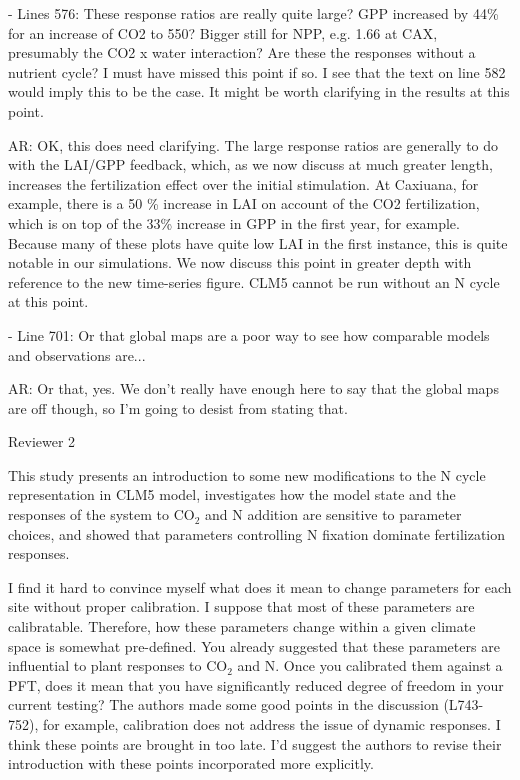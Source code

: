 \documentclass{article}
\begin{document}
- Lines 576: These response ratios are really quite large? GPP increased by 44\% for an increase of CO2 to 550? Bigger still for NPP, e.g. 1.66 at CAX, presumably the CO2 x water interaction? Are these the responses without a nutrient cycle? I must have missed this point if so. I see that the text on line 582 would imply this to be the case. It might be worth clarifying in the results at this point. 

\textsf{AR: OK, this does need clarifying. The large response ratios are generally to do with the LAI/GPP feedback, which, as we now discuss at much greater length, increases the fertilization effect over the initial stimulation. At Caxiuana, for example, there is a 50 \% increase in LAI on account of the CO2 fertilization, which is on top of the 33\% increase in GPP in the first year, for example. Because many of these plots have quite low LAI in the first instance, this is quite notable in our simulations. We now discuss this point in greater depth with reference to the new time-series figure. CLM5 cannot be run without an N cycle at this point. }

- Line 701: Or that global maps are a poor way to see how comparable models and observations are... 

\textsf{AR: Or that, yes. We don't really have enough here to say that the global maps are off though, so I'm going to desist from stating that.}

Reviewer 2 

This study presents an introduction to some new modifications to the N cycle representation in CLM5 model, investigates how the model state and the responses of the system to CO$_{2}$ and N addition are sensitive to parameter choices, and showed that parameters controlling N fixation dominate fertilization responses. 

I find it hard to convince myself what does it mean to change parameters for each site without proper calibration. I suppose that most of these parameters are calibratable. Therefore, how these parameters change within a given climate space is somewhat pre-defined. You already suggested that these parameters are influential to plant responses to CO$_{2}$ and N. Once you calibrated them against a PFT, does it mean that you have significantly reduced degree of freedom in your current testing? The authors made some good points in the discussion (L743-752), for example, calibration does not address the issue of dynamic responses. I think these points are brought in too late. I'd suggest the authors to revise their introduction with these points incorporated more explicitly.
\end{document}
